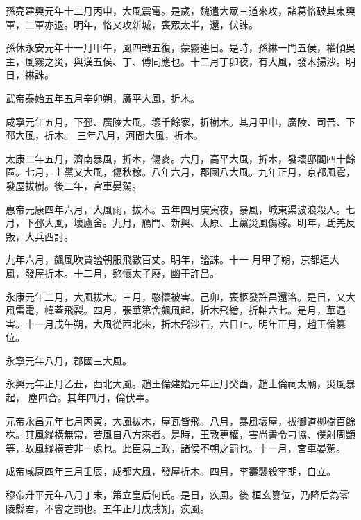 \begin{pinyinscope}
 孫亮建興元年十二月丙申，大風震電。是歲，魏遣大眾三道來攻，諸葛恪破其東興軍，二軍亦退。明年，恪又攻新城，喪眾太半，還，伏誅。



 孫休永安元年十一月甲午，風四轉五復，蒙霧連日。是時，孫綝一門五侯，權傾吳主，風霧之災，與漢五侯、丁、傅同應也。十二月丁卯夜，有大風，發木揚沙。明日，綝誅。



 武帝泰始五年五月辛卯朔，廣平大風，折木。



 咸寧元年五月，下邳、廣陵大風，壞千餘家，折樹木。其月甲申，廣陵、司吾、下邳大風，折木。
 三年八月，河間大風，折木。



 太康二年五月，濟南暴風，折木，傷麥。六月，高平大風，折木，發壞邸閣四十餘區。七月，上黨又大風，傷秋稼。八年六月，郡國八大風。九年正月，京都風雹，發屋拔樹。後二年，宮車晏駕。



 惠帝元康四年六月，大風雨，拔木。五年四月庚寅夜，暴風，城東渠波浪殺人。七月，下邳大風，壞廬舍。九月，鴈門、新興、太原、上黨災風傷稼。明年，氐羌反叛，大兵西討。



 九年六月，飆風吹賈謐朝服飛數百丈。明年，謐誅。十一
 月甲子朔，京都連大風，發屋折木。十二月，愍懷太子廢，幽于許昌。



 永康元年二月，大風拔木。三月，愍懷被害。己卯，喪柩發許昌還洛。是日，又大風雷電，幃蓋飛裂。四月，張華第舍飆風起，折木飛繒，折軸六七。是月，華遇害。十一月戊午朔，大風從西北來，折木飛沙石，六日止。明年正月，趙王倫篡位。



 永寧元年八月，郡國三大風。



 永興元年正月乙丑，西北大風。趙王倫建始元年正月癸酉，趙土倫祠太廟，災風暴起，
 塵四合。其年四月，倫伏辜。



 元帝永昌元年七月丙寅，大風拔木，屋瓦皆飛。八月，暴風壞屋，拔御道柳樹百餘株。其風縱橫無常，若風自八方來者。是時，王敦專權，害尚書令刁協、僕射周顗等，故風縱橫若非一處也。此臣易上政，諸侯不朝之罰也。十一月，宮車晏駕。



 成帝咸康四年三月壬辰，成都大風，發屋折木。四月，李壽襲殺李期，自立。



 穆帝升平元年八月丁未，策立皇后何氏。是日，疾風。後
 桓玄篡位，乃降后為零陵縣君，不睿之罰也。五年正月戊戌朔，疾風。




\end{pinyinscope}
